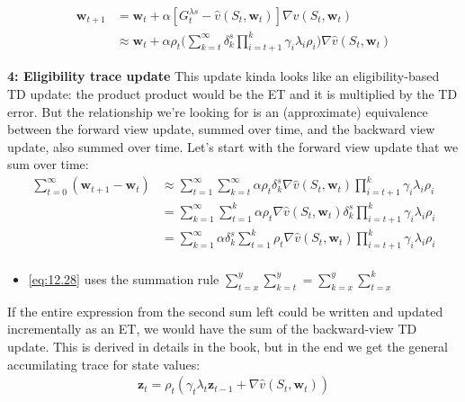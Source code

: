\documentclass[sutton_barto_notes.tex]{subfiles}
\begin{document}
 
\begin{align}
\mathbf{w}_{t+1} & = \mathbf{w}_{t} + \alpha [G_t^{\lambda s} - \hat{v}(S_t, \mathbf{w}_{t})] \nabla \hat{v}(S_t, \mathbf{w}_{t}) \label{eq:12.25}\tag{12.25}\\
 & \approx \mathbf{w}_{t} + \alpha \rho_t \Big( \sum_{k=t}^{\infty} \delta_k^s \prod_{i=t+1}^k \gamma_i \lambda_i \rho_i\Big) \nabla \hat{v}(S_t, \mathbf{w}_{t}) \label{eq:12.26}\tag{12.26}
\end{align} 

 \textbf{4: Eligibility trace update} 
This update kinda looks like an eligibility-based TD update: the product product would be the ET and it is multiplied by the TD error. But the relationship we’re looking for is an (approximate) equivalence between the forward view update, summed over time, and the backward view update, also summed over time. Let’s start with the forward view update that we sum over time: 
\begin{align}
\sum_{t=0}^{\infty} (\mathbf{w}_{t+1} - \mathbf{w}_{t}) & \approx \sum_{t=1}^{\infty} \sum_{k=t}^{\infty} \alpha \rho_t \delta_k^s \nabla \hat{v}(S_t, \mathbf{w}_t) \prod_{i=t+1}^k \gamma_i \lambda_i \rho_i \label{eq:12.27}\tag{12.27}\\
& = \sum_{k=1}^{\infty} \sum_{t=1}^{k} \alpha \rho_t \nabla \hat{v}(S_t, \mathbf{w}_t) \delta_k^s \prod_{i=t+1}^k \gamma_i \lambda_i \rho_i \label{eq:12.28}\tag{12.28}\\
& = \sum_{k=1}^{\infty} \alpha \delta_k^s \sum_{t=1}^{k} \rho_t \nabla \hat{v}(S_t, \mathbf{w}_t) \prod_{i=t+1}^k \gamma_i \lambda_i \rho_i \label{eq:12.29}\tag{12.29}\\
\end{align} 

\begin{itemize}
\item \ref{eq:12.28} uses the summation rule $\sum_{t=x}^y \sum_{k=t}^y = \sum_{k=x}^y \sum_{t=x}^k$ 
\end{itemize}

 If the entire expression from the second sum left could be written and updated incrementally as an ET, we would have the sum of the backward-view TD update. This is derived in details in the book, but in the end we get the general accumilating trace for state values: 
\begin{align}
\mathbf{z}_{t} = \rho_t (\gamma_t \lambda_t \mathbf{z}_{t-1} + \nabla \hat{v}(S_t, \mathbf{w}_{t})) \label{eq:12.30}\tag{12.30}
\end{align}
\end{document}
